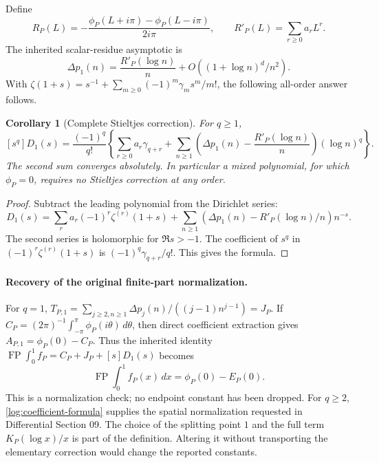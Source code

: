 \documentclass[11pt,letterpaper]{article}
\numberwithin{equation}{section}
\theoremstyle{plain}
\newtheorem{corollary}[theorem]{Corollary}
\theoremstyle{definition}
\theoremstyle{remark}
\begin{document}
Define
\[
 R_P(L)=-\frac{\phi_P(L+i\pi)-\phi_P(L-i\pi)}{2i\pi},
 \qquad R'_P(L)=\sum_{r\ge0}a_rL^r.
\]
The inherited scalar-residue asymptotic \cite[Section 2]{DPL} is
\[
 \Delta p_1(n)=\frac{R'_P(\log n)}n
                 +O((1+\log n)^d/n^2).
\]
With $\zeta(1+s)=s^{-1}+\sum_{m\ge0}(-1)^m\gamma_m s^m/m!$,
the following all-order answer follows.

\begin{corollary}[Complete Stieltjes correction]
\label{log:Stieltjes}
For $q\ge1$,
\begin{equation}\label{log:stieltjes-formula}
 \boxed{\displaystyle
 [s^q]D_1(s)=\frac{(-1)^q}{q!}
 \left\{\sum_{r\ge0}a_r\gamma_{q+r}
 +\sum_{n\ge1}\left(\Delta p_1(n)-\frac{R'_P(\log n)}n\right)
                      (\log n)^q\right\}.}
\end{equation}
The second sum converges absolutely. In particular a mixed polynomial,
for which $\phi_P=0$, requires no Stieltjes correction at any order.
\end{corollary}
\begin{proof}
Subtract the leading polynomial from the Dirichlet series:
\[
 D_1(s)=\sum_r a_r(-1)^r\zeta^{(r)}(1+s)
  +\sum_{n\ge1}\left(\Delta p_1(n)-R'_P(\log n)/n\right)n^{-s}.
\]
The second series is holomorphic for $\Re s>-1$. The coefficient
of $s^q$ in $(-1)^r\zeta^{(r)}(1+s)$ is
$(-1)^q\gamma_{q+r}/q!$. This gives the formula.
\end{proof}

\paragraph{Recovery of the original finite-part normalization.}
For $q=1$, $T_{P,1}=\sum_{j\ge2,n\ge1}
\Delta p_j(n)/((j-1)n^{j-1})=J_P$.
If $C_P=(2\pi)^{-1}\int_{-\pi}^{\pi}\phi_P(i\theta)\,d\theta$,
then direct coefficient extraction gives
$A_{P,1}=\phi_P(0)-C_P$.
Thus the inherited identity
$\operatorname{FP}\int_0^1 f_P=C_P+J_P+[s]D_1(s)$ becomes
\begin{equation}\label{log:fpcheck}
 \operatorname{FP}\int_0^1f_P(x)\,dx=\phi_P(0)-E_P(0).
\end{equation}
This is a normalization check; no endpoint constant has been dropped.
For $q\ge2$, \eqref{log:coefficient-formula} supplies the spatial
normalization requested in Differential Section 09. The choice of the
splitting point $1$ and the full term $K_P(\log x)/x$ is part of the
definition. Altering it without transporting the elementary correction
would change the reported constants.
\end{document}
